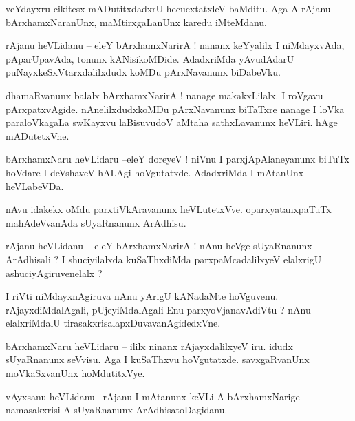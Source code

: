 \documentclass{article}
\begin{document}
\begin{mng}%
veYdayxru cikitesx mADutitxdadxrU hecucxtatxleV baMditu. Aga A rAjanu bArxhamxNaranUnx, 
maMtirxgaLanUnx karedu iMteMdanu.
\end{mng}

\begin{mng}%
rAjanu heVLidanu -- eleY bArxhamxNarirA ! nananx keYyalilx I niMdayxvAda, pAparUpavAda, tonunx 
kANisikoMDide. AdadxriMda yAvudAdarU puNayxkeSxVtarxdalilxdudx koMDu pArxNavanunx biDabeVku.
\end{mng}

\begin{mng}%
dhamaRvanunx balalx bArxhamxNarirA ! nanage makakxLilalx. I roVgavu pArxpatxvAgide. 
nAnelilxdudxkoMDu pArxNavanunx biTaTxre nanage I loVka paraloVkagaLa swKayxvu laBisuvudoV aMtaha 
sathxLavanunx heVLiri. hAge mADutetxVne.
\end{mng}

\begin{mng}%
bArxhamxNaru heVLidaru --eleY doreyeV ! niVnu I parxjApAlaneyanunx biTuTx hoVdare I deVshaveV 
hALAgi hoVgutatxde. AdadxriMda I mAtanUnx heVLabeVDa.
\end{mng}

\begin{mng}%
nAvu idakekx oMdu parxtiVkAravanunx heVLutetxVve. oparxyatanxpaTuTx mahAdeVvanAda sUyaRnanunx 
ArAdhisu.
\end{mng}

\begin{mng}%
rAjanu heVLidanu -- eleY bArxhamxNarirA ! nAnu heVge sUyaRnanunx ArAdhisali ? I shuciyilalxda 
kuSaThxdiMda parxpaMcadalilxyeV elalxrigU ashuciyAgiruvenelalx ?
\end{mng}

\begin{mng}%
I riVti niMdayxnAgiruva nAnu yArigU kANadaMte hoVguvenu. rAjayxdiMdalAgali, pUjeyiMdalAgali Enu 
parxyoVjanavAdiVtu ? nAnu elalxriMdalU tirasakxrisalapxDuvavanAgidedxVne.
\end{mng}

\begin{mng}%
bArxhamxNaru heVLidaru -- ililx ninanx rAjayxdalilxyeV iru. idudx sUyaRnanunx seVvisu. Aga I 
kuSaThxvu hoVgutatxde. savxgaRvanUnx moVkaSxvanUnx hoMdutitxVye.
\end{mng}

\begin{mng}%
vAyxsanu heVLidanu-- rAjanu I mAtanunx keVLi A bArxhamxNarige namasakxrisi A sUyaRnanunx 
ArAdhisatoDagidanu.
\end{mng}
\end{document}
